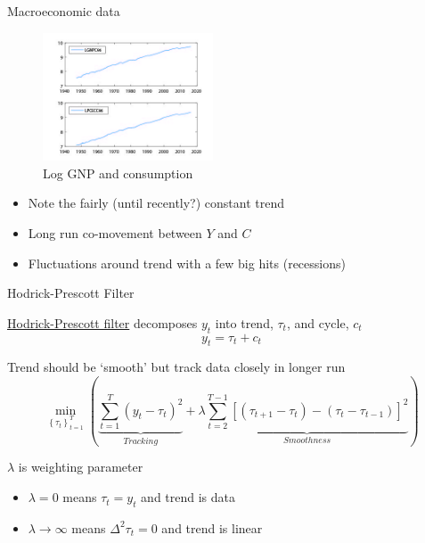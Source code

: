 \begin{frame}{Macroeconomic data}

\begin{figure}
\caption[GNP-PCE]{Log GNP and consumption}
\centering
\label{fig:gnp_pce}
\includegraphics[width=0.45\textwidth]{Figures/gnp_pce.JPG}
\end{figure}

\begin{itemize}
\item	Note the fairly (until recently?) constant trend
\item	Long run co-movement between $Y$ and $C$
\item	Fluctuations around trend with a few big hits (recessions)
\end{itemize}

\end{frame}


\begin{frame}{Hodrick-Prescott Filter}

\href{https://en.wikipedia.org/wiki/Hodrick\%E2\%80\%93Prescott_filter}{Hodrick-Prescott filter} decomposes $y_{t}$ into trend, $\tau _{t}$, and cycle, $c_{t}$
\begin{equation*}
y_{t}=\tau _{t}+c_{t}
\end{equation*}

Trend should be `smooth' but track data closely in longer run
\begin{equation*}
\underset{\left\{ \tau _{t}\right\}_{t=1}^{T}}{\min}\left( \underbrace{\sum_{t=1}^{T}(y_{t}-\tau _{t})^{2}}_{Tracking}+\lambda \underbrace{\sum_{t=2}^{T-1}\left[ \left( \tau _{t+1}-\tau _{t}\right) -\left( \tau
_{t}-\tau _{t-1}\right) \right] ^{2}}_{Smoothness} \right)
\end{equation*}

$\lambda$ is weighting parameter
	\begin{itemize}
	\item $\lambda =0$ means $\tau _{t}=y_{t}$ and trend is data
	\item $\lambda \rightarrow \infty $ means $\Delta^{2}\tau_{t}=0$ and trend is linear
	\end{itemize}

\end{frame}

